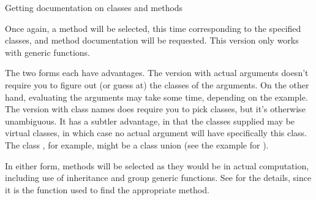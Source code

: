 \begin{Section}{Getting documentation on classes and methods}

Once again, a method will be selected, this time corresponding to the
specified classes, and method documentation will be requested.  This
version only works with generic functions.

The two forms each have advantages.  The version with actual arguments
doesn't require you to figure out (or guess at) the classes of the
arguments.
On the other hand, evaluating the arguments may take some time,
depending on the example.
The version with class names does require you to pick classes, but
it's otherwise unambiguous.  It has a subtler advantage, in that the
classes supplied may be virtual classes, in which case no actual
argument will have specifically this class.  The class
, for example, might be a class union (see the
example for ).

In either form, methods will be selected as they would be in actual
computation, including use of inheritance and group generic
functions.  See  for the details, since it is
the function used to find the appropriate method.

\end{Section}
%
